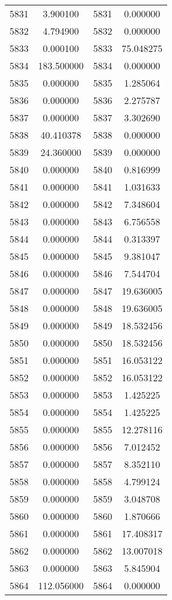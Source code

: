 \documentclass[12pt]{article}
\begin{document}
\begin{longtable}{@{}cccc@{}}
5831 & 3.900100 & 5831 & 0.000000 \\
5832 & 4.794900 & 5832 & 0.000000 \\
5833 & 0.000100 & 5833 & 75.048275 \\
5834 & 183.500000 & 5834 & 0.000000 \\
5835 & 0.000000 & 5835 & 1.285064 \\
5836 & 0.000000 & 5836 & 2.275787 \\
5837 & 0.000000 & 5837 & 3.302690 \\
5838 & 40.410378 & 5838 & 0.000000 \\
5839 & 24.360000 & 5839 & 0.000000 \\
5840 & 0.000000 & 5840 & 0.816999 \\
5841 & 0.000000 & 5841 & 1.031633 \\
5842 & 0.000000 & 5842 & 7.348604 \\
5843 & 0.000000 & 5843 & 6.756558 \\
5844 & 0.000000 & 5844 & 0.313397 \\
5845 & 0.000000 & 5845 & 9.381047 \\
5846 & 0.000000 & 5846 & 7.544704 \\
5847 & 0.000000 & 5847 & 19.636005 \\
5848 & 0.000000 & 5848 & 19.636005 \\
5849 & 0.000000 & 5849 & 18.532456 \\
5850 & 0.000000 & 5850 & 18.532456 \\
5851 & 0.000000 & 5851 & 16.053122 \\
5852 & 0.000000 & 5852 & 16.053122 \\
5853 & 0.000000 & 5853 & 1.425225 \\
5854 & 0.000000 & 5854 & 1.425225 \\
5855 & 0.000000 & 5855 & 12.278116 \\
5856 & 0.000000 & 5856 & 7.012452 \\
5857 & 0.000000 & 5857 & 8.352110 \\
5858 & 0.000000 & 5858 & 4.799124 \\
5859 & 0.000000 & 5859 & 3.048708 \\
5860 & 0.000000 & 5860 & 1.870666 \\
5861 & 0.000000 & 5861 & 17.408317 \\
5862 & 0.000000 & 5862 & 13.007018 \\
5863 & 0.000000 & 5863 & 5.845904 \\
5864 & 112.056000 & 5864 & 0.000000 \\

\end{longtable}
\end{document}
